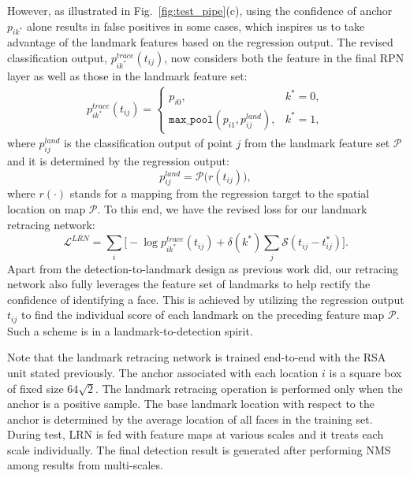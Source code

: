 \documentclass[10pt,twocolumn,letterpaper]{article}
\begin{document}
%
However, as illustrated in Fig.~\ref{fig:test_pipe}(c), using the confidence of anchor $p_{ik^*}$ alone results in 
false positives in some cases, which inspires us to take advantage of the landmark features based on the regression output. The revised classification output, $p_{i k^*}^{trace}(t_{ij})$, now considers both the feature in the final RPN layer as well as those in the landmark feature set:
\begin{align}
p_{i k^*}^{trace}(t_{ij})=\begin{cases} p_{i0}, & k^* = 0, \\  \texttt{max\_pool}(p_{i1}, p_{ij}^{land}), &  k^* = 1,\end{cases} 
\end{align}
where $p_{ij}^{land}$ is the classification output of point $j$ from the landmark feature set $\mathcal{P}$
and it is determined by the regression output:
\begin{equation}
p_{ij}^{land} = \mathcal{P} \big( r(t_{ij}) \big),
\end{equation}
where $r(\cdot)$ stands for a mapping from the regression target to the spatial location on map $\mathcal{P}$. To this end, we have the revised loss for our landmark retracing network:
\begin{equation}
  \mathcal{L}^{LRN} = \sum_i  \bigg[ -\log p_{i k^*}^{trace}(t_{ij}) + \delta(k^*)  \sum_j \mathcal{S}(t_{ij} - t_{ij}^*) \bigg].
\end{equation}
%
%
Apart from the detection-to-landmark design as previous work did, our retracing network  also fully leverages
the feature set of landmarks to help rectify the confidence of identifying a face. This is achieved by utilizing the regression output $t_{ij}$ to find the individual score of each landmark on the preceding feature map $\mathcal{P}$. Such a scheme is in a landmark-to-detection spirit.  

Note that the landmark retracing network is trained end-to-end with the RSA unit stated previously. The anchor associated with each location $i$ is a square box of fixed size $64\sqrt{2}$.
%
The landmark retracing operation is performed only when the anchor is a positive sample. The base landmark location with respect to the anchor is determined by the average location of all faces in the training set.
%
During test, %
LRN is fed with feature maps at various scales and it treats each scale individually. The final detection result is generated after performing NMS among results from multi-scales.
\end{document}
